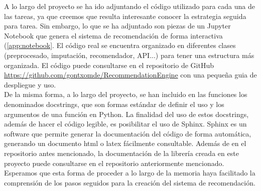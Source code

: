 A lo largo del proyecto se ha ido adjuntando el código utilizado para cada una de las tareas, ya que creemos que resulta interesante conocer la estrategia seguida para tarea. Sin embargo, lo que se ha adjuntado son piezas de un Jupyter Notebook que genera el sistema de recomendación de forma interactiva (\autoref{app:notebook}. El código real se encuentra organizado en diferentes clases (preprocesado, imputación, recomendador, API...) para tener una estructura más organizada. El código puede consultarse en el repositorio de GitHub \url{https://github.com/gontxomde/RecommendationEngine} con una pequeña guia de despliegue y uso.\\

De la misma forma, a lo largo del proyecto, se han incluido en las funciones los denominados docstrings, que son formas estándar de definir el uso y los argumentos de una función en Python. La finalidad del uso de estos docstrings, además de hacer el código legible, es posibilitar el uso de Sphinx. Sphinx es un software que permite generar la documentación del código de forma automática, generando un documento html o latex fácilmente consultable. Además de en el repositorio antes mencionado, la documentación de la librería creada en este proyecto puede consultarse en el repositorio anteriormente mencionado.\\

Esperamos que esta forma de proceder a lo largo de la memoria haya facilitado la comprensión de los pasos seguidos para la creación del sistema de recomendación.


